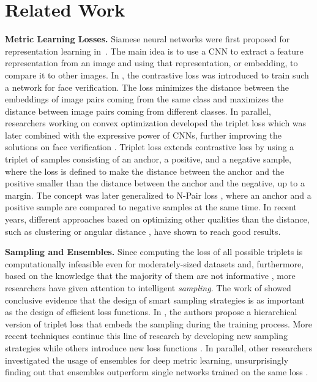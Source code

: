\documentclass{article}
\begin{document}
 \section{Related Work}

\textbf{Metric Learning Losses.} Siamese neural networks were first proposed for representation learning in~\cite{bromley1994signature}. The main idea is to use a CNN to extract a feature representation from an image and using that representation, or embedding, to compare it to other images.
In \cite{DBLP:conf/cvpr/ChopraHL05}, the contrastive loss was introduced to train such a network for face verification. The loss minimizes the distance between the embeddings of image pairs coming from the same class and maximizes the distance between image pairs coming from different classes.
In parallel, researchers working on convex optimization developed the triplet loss \cite{DBLP:conf/nips/SchultzJ03,DBLP:journals/jmlr/WeinbergerS09} which was later combined with the expressive power of CNNs, further improving the solutions on face verification \cite{DBLP:conf/cvpr/SchroffKP15}. 
Triplet loss extends contrastive loss by using a triplet of samples consisting of an anchor, a positive, and a negative sample, where the loss is defined to make the distance between the anchor and the positive smaller than the distance between the anchor and the negative, up to a margin. 
The concept was later generalized to N-Pair loss \cite{DBLP:conf/nips/Sohn16}, where an anchor and a positive sample are compared to  negative samples at the same time. In recent years, different approaches based on optimizing other qualities than the distance, such as clustering \cite{DBLP:conf/icml/LawUZ17,DBLP:journals/corr/abs-1110-2515} or angular distance \cite{DBLP:conf/iccv/WangZWLL17}, have shown to reach good results. 

\textbf{Sampling and Ensembles.} Since computing the loss of all possible triplets is computationally infeasible even for moderately-sized datasets and, furthermore, based on the knowledge that the majority of them are not informative \cite{DBLP:conf/cvpr/SchroffKP15}, more researchers have given attention to intelligent \textit{sampling}. 
The work of \cite{DBLP:conf/iccv/ManmathaWSK17} showed conclusive evidence that the design of smart sampling strategies is as important as the design of efficient loss functions.
In \cite{DBLP:conf/eccv/GeHDS18}, the authors propose a hierarchical version of triplet loss that embeds the sampling during the training process. More recent techniques continue this line of research by developing new sampling strategies \cite{DDBLP:conf/cvpr/Duan2019, DBLP:journals/corr/abs-2007-12749,DBLP:conf/wacv/XuanSP20} while others introduce new loss functions \cite{DDBLP:conf/cvpr/Wand2019,DDBLP:conf/cvpr/Xu2019}. 
In parallel, other researchers investigated the usage of ensembles for deep metric learning, unsurprisingly finding out that ensembles outperform single networks trained on the same loss \cite{DBLP:conf/eccv/KimGCLK18,DBLP:conf/iccv/OpitzWPB17,DDBLP:conf/cvpr/Sanakoyeu2019,DBLP:conf/eccv/XuanSP18,DBLP:conf/iccv/YuanYZ17}.
\end{document}
